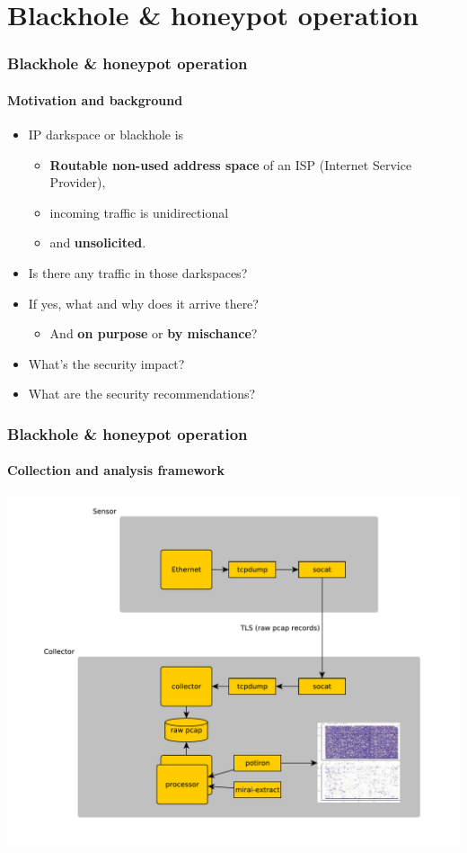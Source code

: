 \documentclass{beamer}
\begin{document}
\section{Blackhole \& honeypot operation}
\begin{frame}
\frametitle{Blackhole \& honeypot operation}
\framesubtitle{Motivation and background}
\begin{itemize}
    \item IP darkspace or blackhole is
    \begin{itemize}
        \item {\bf Routable non-used address space} of an ISP (Internet Service Provider),
        \item incoming traffic is unidirectional
        \item and {\bf unsolicited}.
    \end{itemize}
    \item Is there any traffic in those darkspaces?
    \item If yes, what and why does it arrive there?
    \begin{itemize}
            \item And {\bf on purpose} or {\bf by mischance}?
    \end{itemize}
    \item What's the security impact?
    \item What are the security recommendations?
\end{itemize}
\end{frame}


\begin{frame}
        \frametitle{Blackhole \& honeypot operation}
        \framesubtitle{Collection and analysis framework}
        \includegraphics[scale=0.29]{overview-sensor.pdf}
\end{frame}
\end{document}
